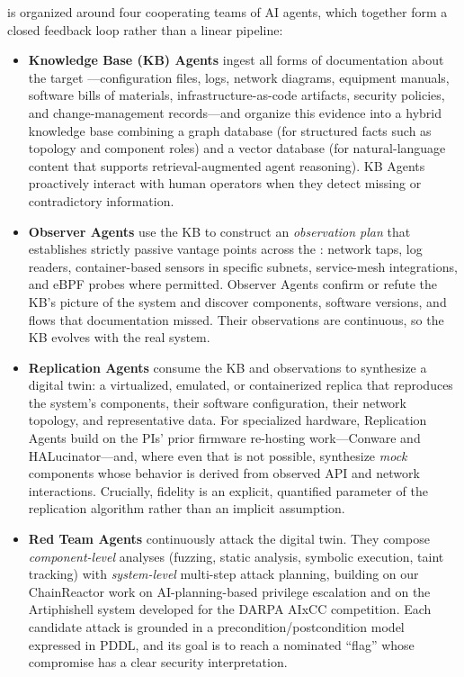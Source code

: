 \sysname is organized around four cooperating teams of AI agents, which
together form a closed feedback loop rather than a linear pipeline:

\begin{itemize}[leftmargin=1.3em,itemsep=0.15em,topsep=0.3em]
  \item \textbf{Knowledge Base (KB) Agents} ingest all forms of
  documentation about the target \cps---configuration files, logs,
  network diagrams, equipment manuals, software bills of materials,
  infrastructure-as-code artifacts, security policies, and
  change-management records---and organize this evidence into a hybrid
  knowledge base combining a graph database (for structured facts such
  as topology and component roles) and a vector database (for
  natural-language content that supports retrieval-augmented agent
  reasoning). KB Agents proactively interact with human operators when
  they detect missing or contradictory information.

  \item \textbf{Observer Agents} use the KB to construct an
  \emph{observation plan} that establishes strictly passive vantage
  points across the \cps: network taps, log readers, container-based
  sensors in specific subnets, service-mesh integrations, and eBPF
  probes where permitted. Observer Agents confirm or refute the KB's
  picture of the system and discover components, software versions,
  and flows that documentation missed. Their observations are
  continuous, so the KB evolves with the real system.

  \item \textbf{Replication Agents} consume the KB and observations to
  synthesize a digital twin: a virtualized, emulated, or containerized
  replica that reproduces the system's components, their software
  configuration, their network topology, and representative data. For
  specialized hardware, Replication Agents build on the PIs' prior
  firmware re-hosting work---Conware and HALucinator---and, where even
  that is not possible, synthesize \emph{mock} components whose behavior
  is derived from observed API and network interactions. Crucially,
  fidelity is an explicit, quantified parameter of the replication
  algorithm rather than an implicit assumption.

  \item \textbf{Red Team Agents} continuously attack the digital twin.
  They compose \emph{component-level} analyses (fuzzing, static
  analysis, symbolic execution, taint tracking) with \emph{system-level}
  multi-step attack planning, building on our ChainReactor work on
  AI-planning-based privilege escalation and on the Artiphishell system
  developed for the DARPA AIxCC competition. Each candidate attack is
  grounded in a precondition/postcondition model expressed in PDDL, and
  its goal is to reach a nominated ``flag'' whose compromise has a
  clear security interpretation.
\end{itemize}

